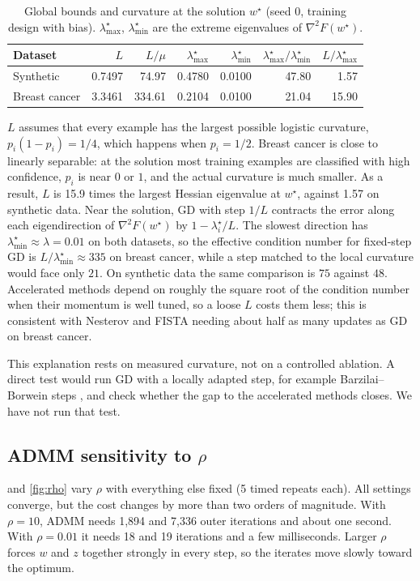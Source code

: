 \documentclass{article}
\begin{document}
\begin{table}[t]
\caption{Global bounds and curvature at the solution $w^\star$ (seed 0, training design with bias). $\lambda_{\max}^\star$, $\lambda_{\min}^\star$ are the extreme eigenvalues of $\nabla^2F(w^\star)$.}
\label{tab:conditioning}
\centering
\small
\begin{tabular}{lrrrrrr}
\toprule
Dataset & $L$ & $L/\mu$ & $\lambda_{\max}^\star$ & $\lambda_{\min}^\star$ & $\lambda_{\max}^\star/\lambda_{\min}^\star$ & $L/\lambda_{\max}^\star$\\
\midrule
Synthetic     & 0.7497 & 74.97  & 0.4780 & 0.0100 & 47.80 & 1.57\\
Breast cancer & 3.3461 & 334.61 & 0.2104 & 0.0100 & 21.04 & 15.90\\
\bottomrule
\end{tabular}
\end{table}

$L$ assumes that every example has the largest possible logistic curvature, $p_i(1-p_i)=1/4$, which happens when $p_i=1/2$. Breast cancer is close to linearly separable: at the solution most training examples are classified with high confidence, $p_i$ is near $0$ or $1$, and the actual curvature is much smaller. As a result, $L$ is 15.9 times the largest Hessian eigenvalue at $w^\star$, against 1.57 on synthetic data. Near the solution, GD with step $1/L$ contracts the error along each eigendirection of $\nabla^2F(w^\star)$ by $1-\lambda_i^\star/L$. The slowest direction has $\lambda_{\min}^\star\approx\lambda=0.01$ on both datasets, so the effective condition number for fixed-step GD is $L/\lambda_{\min}^\star\approx335$ on breast cancer, while a step matched to the local curvature would face only $21$. On synthetic data the same comparison is $75$ against $48$. Accelerated methods depend on roughly the square root of the condition number when their momentum is well tuned, so a loose $L$ costs them less; this is consistent with Nesterov and FISTA needing about half as many updates as GD on breast cancer.

This explanation rests on measured curvature, not on a controlled ablation. A direct test would run GD with a locally adapted step, for example Barzilai--Borwein steps \citep{barzilai1988two}, and check whether the gap to the accelerated methods closes. We have not run that test.

\subsection{ADMM sensitivity to \texorpdfstring{$\rho$}{rho}}
\label{sec:rho}
 and \cref{fig:rho} vary $\rho$ with everything else fixed (5 timed repeats each). All settings converge, but the cost changes by more than two orders of magnitude. With $\rho=10$, ADMM needs 1{,}894 and 7{,}336 outer iterations and about one second. With $\rho=0.01$ it needs 18 and 19 iterations and a few milliseconds. Larger $\rho$ forces $w$ and $z$ together strongly in every step, so the iterates move slowly toward the optimum.
\end{document}
